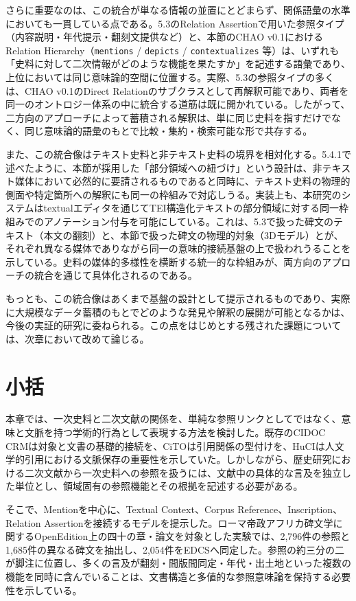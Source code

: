 さらに重要なのは、この統合が単なる情報の並置にとどまらず、関係語彙の水準においても一貫している点である。5.3のRelation Assertionで用いた参照タイプ（内容説明・年代提示・翻刻文提供など）と、本節のCHAO v0.1におけるRelation Hierarchy（\texttt{mentions} / \texttt{depicts} / \texttt{contextualizes} 等）は、いずれも「史料に対して二次情報がどのような機能を果たすか」を記述する語彙であり、上位においては同じ意味論的空間に位置する。実際、5.3の参照タイプの多くは、CHAO v0.1のDirect Relationのサブクラスとして再解釈可能であり、両者を同一のオントロジー体系の中に統合する道筋は既に開かれている。したがって、二方向のアプローチによって蓄積される解釈は、単に同じ史料を指すだけでなく、同じ意味論的語彙のもとで比較・集約・検索可能な形で共存する。

また、この統合像はテキスト史料と非テキスト史料の境界を相対化する。5.4.1で述べたように、本節が採用した「部分領域への紐づけ」という設計は、非テキスト媒体において必然的に要請されるものであると同時に、テキスト史料の物理的側面や特定箇所への解釈にも同一の枠組みで対応しうる。実装上も、本研究のシステムはtextualエディタを通じてTEI構造化テキストの部分領域に対する同一枠組みでのアノテーション付与を可能にしている。これは、5.3で扱った碑文のテキスト（本文の翻刻）と、本節で扱った碑文の物理的対象（3Dモデル）とが、それぞれ異なる媒体でありながら同一の意味的接続基盤の上で扱われうることを示している。史料の媒体的多様性を横断する統一的な枠組みが、両方向のアプローチの統合を通じて具体化されるのである。

もっとも、この統合像はあくまで基盤の設計として提示されるものであり、実際に大規模なデータ蓄積のもとでどのような発見や解釈の展開が可能となるかは、今後の実証的研究に委ねられる。この点をはじめとする残された課題については、次章において改めて論じる。

\section{小括}

本章では、一次史料と二次文献の関係を、単純な参照リンクとしてではなく、意味と文脈を持つ学術的行為として表現する方法を検討した。既存のCIDOC CRMは対象と文書の基礎的接続を、CiTOは引用関係の型付けを、HuCIは人文学的引用における文脈保存の重要性を示していた。しかしながら、歴史研究における二次文献から一次史料への参照を扱うには、文献中の具体的な言及を独立した単位とし、領域固有の参照機能とその根拠を記述する必要がある。

そこで、Mentionを中心に、Textual Context、Corpus Reference、Inscription、Relation Assertionを接続するモデルを提示した。ローマ帝政アフリカ碑文学に関するOpenEdition上の四十の章・論文を対象とした実験では、2,796件の参照と1,685件の異なる碑文を抽出し、2,054件をEDCSへ同定した。参照の約三分の二が脚注に位置し、多くの言及が翻刻・間版間同定・年代・出土地といった複数の機能を同時に含んでいることは、文書構造と多値的な参照意味論を保持する必要性を示している。

